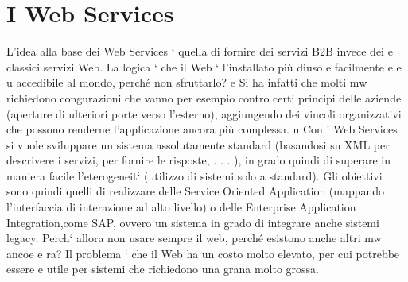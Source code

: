 \documentclass[a4paper,12pt]{article}
\begin{document}
\section{I Web Services}
L'idea alla base dei Web Services ` quella di fornire dei servizi B2B invece dei
e
classici servizi Web. La logica ` che il Web ` l'installato più diuso e facilmente
e
e
u
accedibile al mondo, perché non sfruttarlo?
e
Si ha infatti che molti mw richiedono congurazioni che vanno per esempio
contro certi principi delle aziende (aperture di ulteriori porte verso l'esterno),
aggiungendo dei vincoli organizzativi che possono renderne l'applicazione ancora
più complessa.
u
Con i Web Services si vuole sviluppare un sistema assolutamente standard
(basandosi su XML per descrivere i servizi, per fornire le risposte, . . . ), in grado quindi di superare in maniera
facile l'eterogeneit` (utilizzo di sistemi solo
a
standard). Gli obiettivi sono quindi quelli di realizzare delle Service Oriented
Application (mappando l'interfaccia di interazione ad alto livello) o delle Enterprise Application Integration,come SAP,
ovvero un sistema in grado di integrare
anche sistemi legacy.
Perch` allora non usare sempre il web, perché esistono anche altri mw ancoe
e
ra? Il problema ` che il Web ha un costo molto elevato, per cui potrebbe essere
e
utile per sistemi che richiedono una grana molto grossa.
\end{document}
